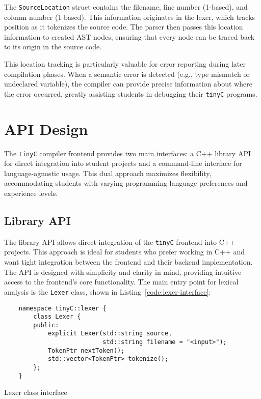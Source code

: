 The \texttt{SourceLocation} struct contains the filename, line number (1-based), and column number (1-based). This information originates in the lexer, which tracks position as it tokenizes the source code. The parser then passes this location information to created AST nodes, ensuring that every node can be traced back to its origin in the source code.

This location tracking is particularly valuable for error reporting during later compilation phases. When a semantic error is detected (e.g., type mismatch or undeclared variable), the compiler can provide precise information about where the error occurred, greatly assisting students in debugging their \texttt{tinyC} programs.


\section{API Design}

The \texttt{tinyC} compiler frontend provides two main interfaces: a C++ library API for direct integration into student projects and a command-line interface for language-agnostic usage. This dual approach maximizes flexibility, accommodating students with varying programming language preferences and experience levels.


\subsection{Library API}

The library API allows direct integration of the \texttt{tinyC} frontend into C++ projects. This approach is ideal for students who prefer working in C++ and want tight integration between the frontend and their backend implementation. The API is designed with simplicity and clarity in mind, providing intuitive access to the frontend's core functionality.
The main entry point for lexical analysis is the \texttt{Lexer} class, shown in Listing~\ref{code:lexer-interface}:
\begin{listing}[ht!]
    \begin{verbatim}
    namespace tinyC::lexer {
        class Lexer {
        public:
            explicit Lexer(std::string source, 
                           std::string filename = "<input>");
            TokenPtr nextToken();
            std::vector<TokenPtr> tokenize();
        };
    }
    \end{verbatim}
    \caption{Lexer class interface}
    \label{code:lexer-interface}
\end{listing}


